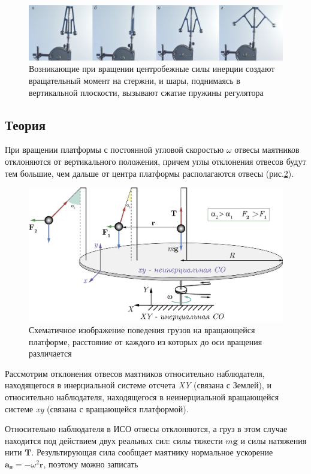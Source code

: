 \documentclass[All.tex]{subfiles}
\begin{document}
\begin{figure}[H] 
	\centering 		
	\includegraphics[width=1\linewidth]{regulator-1.png} 
	\caption{Возникающие при вращении центробежные силы инерции создают вращательный момент на стержни, и шары, поднимаясь в вертикальной плоскости, вызывают сжатие пружины регулятора}
	\label{regulator-1}
\end{figure}

\subsection*{\textcolor{PineGreen}{Теория}}

При вращении платформы с постоянной угловой скоростью $ \omega $ отвесы маятников отклоняются от вертикального положения, причем углы отклонения отвесов будут тем большие, чем дальше от центра платформы располагаются отвесы (рис.\ref{platform-3}).

\begin{figure}[H] 
	\centering 		
	\includegraphics[width=0.8\linewidth]{platform-3.png} 
	\caption{Схематичное изображение поведения грузов на вращающейся платформе, расстояние от каждого из которых до оси вращения различается}
	\label{platform-3}
\end{figure}

Рассмотрим отклонения отвесов маятников относительно наблюдателя, находящегося в инерциальной
системе отсчета \textit{XY} (связана с Землей), и относительно наблюдателя, находящегося в неинерциальной вращающейся системе \textit{xy} (связана с вращающейся платформой). 



Относительно наблюдателя в ИСО отвесы отклоняются, а груз в этом случае находится под действием двух реальных сил: силы тяжести $ m\textbf{g} $ и силы натяжения нити $ \textbf{T} $.
Результирующая сила сообщает маятнику нормальное ускорение $ \textbf{a}_{\text{н}} = -\omega^{2}\textbf{r}  $, поэтому можно записать
\end{document}
